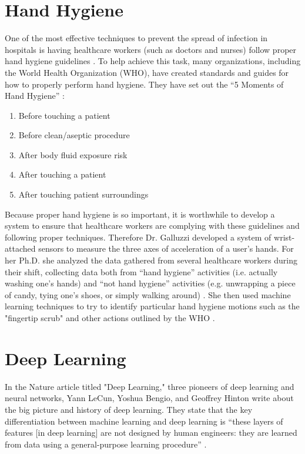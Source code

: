 \documentclass[]{report}
\begin{document}
\section{Hand Hygiene}

One of the most effective techniques to prevent the spread of infection in hospitals is having healthcare workers (such as doctors and nurses) follow proper hand hygiene guidelines \cite{Galluzzi}. To help achieve this task, many organizations, including the World Health Organization (WHO), have created standards and guides for how to properly perform hand hygiene. They have set out the ``5 Moments of Hand Hygiene'' \cite{WHO}:
\begin{enumerate}
	\item Before touching a patient
	\item Before clean/aseptic procedure
	\item After body fluid exposure risk
	\item After touching a patient
	\item After touching patient surroundings
\end{enumerate}

Because proper hand hygiene is so important, it is worthwhile to develop a system to ensure that healthcare workers are complying with these guidelines and following proper techniques. Therefore Dr. Galluzzi developed a system of wrist-attached sensors to measure the three axes of acceleration of a user's hands. For her Ph.D. she analyzed the data gathered from several healthcare workers during their shift, collecting data both from ``hand hygiene'' activities (i.e. actually washing one's hands) and ``not hand hygiene'' activities (e.g. unwrapping a piece of candy, tying one's shoes, or simply walking around) \cite{Galluzzi}. She then used machine learning techniques to try to identify particular hand hygiene motions such as the "fingertip scrub" and other actions outlined by the WHO \cite{Galluzzi}.

\section{Deep Learning}

In the Nature article titled "Deep Learning," three pioneers of deep learning and neural networks, Yann LeCun, Yoshua Bengio, and Geoffrey Hinton write about the big picture and history of deep learning. They state that the key differentiation between machine learning and deep learning is ``these layers of features [in deep learning] are not designed by human engineers: they are learned from data using a general-purpose learning procedure'' \cite{ThreeGiants}. 
\end{document}

